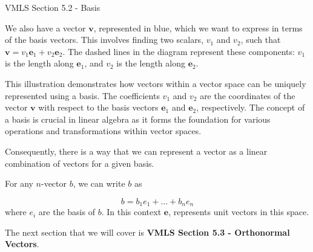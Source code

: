 \begin{notes}{VMLS Section 5.2 - Basis}
\begin{Highlight}
        We also have a vector $\mathbf{v}$, represented in blue, which we want to express in terms of the basis vectors. This involves finding two scalars, $v_1$ and $v_2$, such that $\mathbf{v} = v_1\mathbf{e}_1 
        + v_2\mathbf{e}_2$. The dashed lines in the diagram represent these components: $v_1$ is the length along $\mathbf{e}_1$, and $v_2$ is the length along $\mathbf{e}_2$.

        This illustration demonstrates how vectors within a vector space can be uniquely represented using a basis. The coefficients $v_1$ and $v_2$ are the coordinates of the vector $\mathbf{v}$ with respect 
        to the basis vectors $\mathbf{e}_1$ and $\mathbf{e}_2$, respectively. The concept of a basis is crucial in linear algebra as it forms the foundation for various operations and transformations within 
        vector spaces.
    \end{Highlight}

    Consequently, there is a way that we can represent a vector as a linear combination of vectors for a given basis.

    \begin{Highlight}
        For any $n$-vector $b$, we can write $b$ as 

        \begin{equation*}
            b = b_{1}e_{1} + \dots + b_{n}e_{n}
        \end{equation*}
        where $e_{i}$ are the basis of $b$. In this context $\mathbf{e}$, represents unit vectors in this space.
    \end{Highlight}
\end{notes}

The next section that we will cover is \textbf{VMLS Section 5.3 - Orthonormal Vectors}.

